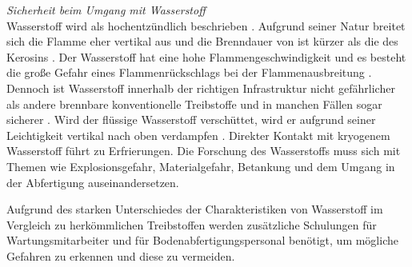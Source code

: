 %
%
%
\textit{Sicherheit beim Umgang mit Wasserstoff}\\
Wasserstoff wird als hochentzündlich beschrieben \cite{dalmia2022powering}. Aufgrund seiner Natur breitet sich die Flamme eher 
vertikal aus und die Brenndauer von  ist kürzer als die des Kerosins \cite{colpan2022fuel}.
Der Wasserstoff hat eine hohe Flammengeschwindigkeit und es besteht die große Gefahr eines Flammenrückschlags bei der Flammenausbreitung \cite{khandelwal2013hydrogen}.
Dennoch ist Wasserstoff innerhalb der richtigen Infrastruktur nicht gefährlicher als andere brennbare konventionelle Treibstoffe und in manchen 
Fällen sogar sicherer \cite{khandelwal2013hydrogen}. 
Wird der flüssige Wasserstoff verschüttet, wird er aufgrund seiner Leichtigkeit vertikal nach oben verdampfen \cite{colpan2022fuel}. 
Direkter Kontakt mit kryogenem Wasserstoff führt zu Erfrierungen.
Die Forschung des Wasserstoffs muss sich mit Themen wie Explosionsgefahr, Materialgefahr, Betankung und 
dem Umgang in der Abfertigung auseinandersetzen. 

%
Aufgrund des starken Unterschiedes der Charakteristiken von Wasserstoff 
im Vergleich zu herkömmlichen Treibstoffen werden zusätzliche Schulungen für 
Wartungsmitarbeiter und für Bodenabfertigungspersonal benötigt, 
um mögliche Gefahren zu erkennen und diese zu vermeiden.
%
%
%
%
